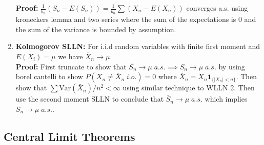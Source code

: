 \documentclass{article}
\begin{document}
\begin{enumerate}
    \textbf{Proof:} \(\frac{1}{b_n}(S_n-E(S_n)) = \frac{1}{b_n} \sum(X_n-E(X_n))\) converges a.s. using kroneckers lemma and two series where the sum of the expectations is 0 and the sum of the variance is bounded by assumption.
    
    \item \textbf{Kolmogorov SLLN:} For i.i.d random variables with finite first moment and \(E(X_i) = \mu\) we have \(\bar X_n \to \mu\).\\
    
    \textbf{Proof:} First truncate to show that \(\bar S_n \to \mu \; a.s. \implies S_n \to \mu \; a.s.\) by using borel cantelli to show \(P(X_n \neq \bar X_n \; i.o.) = 0\) where \(\bar X_n = X_n \mathbf{1}_{\{|X_n|< n\}}\). Then show that \(\sum \text{Var}(\bar X_n)/n^2 < \infty\) using similar technique to WLLN 2. Then use the second moment SLLN to conclude that \(\bar S_n \to \mu \; a.s.\) which implies \(S_n \to \mu \; a.s.\).
\end{enumerate}

\subsection*{Central Limit Theorems}
\end{document}
